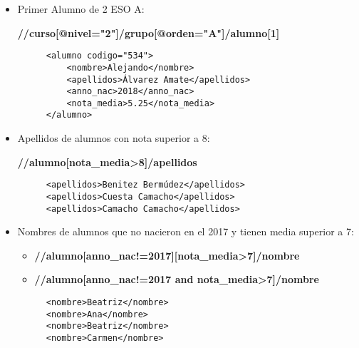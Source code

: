 \begin{itemize}
    \item Primer Alumno de 2 ESO A:

     \textbf{//curso[@nivel="2"]/grupo[@orden="A"]/alumno[1]}
    \begin{figure}[H]
        \begin{tcolorbox}[sharp corners, colback=yellow!30, colframe=white!20]
            \scriptsize
            \begin{verbatim}
<alumno codigo="534">
    <nombre>Alejando</nombre>
    <apellidos>Álvarez Amate</apellidos>
    <anno_nac>2018</anno_nac>
    <nota_media>5.25</nota_media>
</alumno>
            \end{verbatim}
        \end{tcolorbox}
        \end{figure}

        \item Apellidos de alumnos con nota superior a 8:

        \textbf{//alumno[nota\_media>8]/apellidos}

         \begin{figure}[H]
            \begin{tcolorbox}[sharp corners, colback=yellow!30, colframe=white!20]
                \scriptsize
                \begin{verbatim}
<apellidos>Benitez Bermúdez</apellidos>
<apellidos>Cuesta Camacho</apellidos>
<apellidos>Camacho Camacho</apellidos>
                \end{verbatim}
            \end{tcolorbox}
        \end{figure}

        \item Nombres de alumnos que no nacieron en el 2017 y tienen media superior a 7:

        \begin{itemize}
            \item  \textbf{//alumno[anno\_nac!=2017][nota\_media>7]/nombre}
            \item  \textbf{//alumno[anno\_nac!=2017 and nota\_media>7]/nombre}
        \end{itemize}

         \begin{figure}[H]
            \begin{tcolorbox}[sharp corners, colback=yellow!30, colframe=white!20]
                \scriptsize
                \begin{verbatim}
<nombre>Beatriz</nombre>
<nombre>Ana</nombre>
<nombre>Beatriz</nombre>
<nombre>Carmen</nombre>
                \end{verbatim}
            \end{tcolorbox}
        \end{figure}
\end{itemize}

